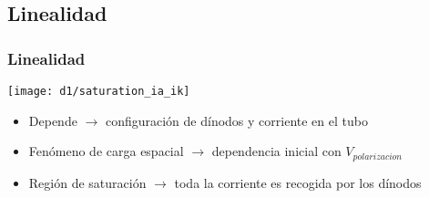 \documentclass{beamer}
\begin{document}

\subsection{Linealidad}

\begin{frame}
\frametitle{Linealidad}
\begin{center}
\texttt{[image: d1/saturation\_ia\_ik]}
\end{center}
\begin{alertblock}{}
\begin{itemize}
\item Depende $\rightarrow$ configuraci\'on de d\'inodos y corriente en el tubo
\item Fen\'omeno de \alert{carga espacial} $\rightarrow$ dependencia inicial con
$V_{polarizacion}$
\item Regi\'on de saturaci\'on $\rightarrow$ toda la corriente es recogida por los
d\'inodos
\end{itemize}
\end{alertblock}
\end{frame} 
\end{document}
